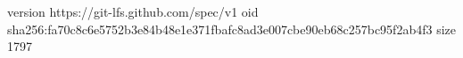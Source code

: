 version https://git-lfs.github.com/spec/v1
oid sha256:fa70c8c6e5752b3e84b48e1e371fbafc8ad3e007cbe90eb68c257bc95f2ab4f3
size 1797
